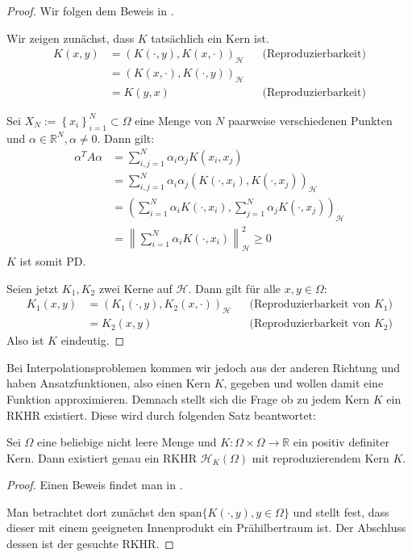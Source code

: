 \begin{proof}
Wir folgen dem Beweis in \textcite[Theorem 3.6]{Santin.2017}.

Wir zeigen zunächst, dass $K$ tatsächlich ein Kern ist.
\begin{align*}
K(x,y) &= \left( K(\cdot,y), K(x, \cdot)\right)_\mathcal{H} &&\text{(Reproduzierbarkeit)}\\
&= \left(K(x,\cdot), K(\cdot,y)\right)_\mathcal{H}\\
&= K(y,x) &&\text{(Reproduzierbarkeit)}
\end{align*}

Sei $X_N := \left\{ x_i \right\}_{i=1}^N \subset \Omega$ eine Menge von $N$ paarweise verschiedenen Punkten und $\alpha \in \mathbb{R}^N, \alpha \neq 0$. Dann gilt:
\begin{align*}
\alpha^T A \alpha &= \sum_{i,j=1}^N \alpha_i \alpha_j K(x_i, x_j)\\
&= \sum_{i,j=1}^N \alpha_i \alpha_j \left(K(\cdot, x_i), K(\cdot,x_j)\right)_\mathcal{H}\\
&= \left(\sum_{i=1}^N \alpha_i K(\cdot,x_i), \sum_{j=1}^N \alpha_j K(\cdot, x_j)\right)_\mathcal{H}\\
&= \left\| \sum_{i=1}^N \alpha_i K(\cdot,x_i)\right\|_\mathcal{H}^2 \geq 0
\end{align*}
$K$ ist somit \ac{PD}.

Seien jetzt $K_1, K_2$ zwei Kerne auf $\mathcal{H}$. Dann gilt für alle $x,y \in \Omega$:
\begin{align*}
K_1(x,y) &= (K_1(\cdot,y), K_2(x, \cdot))_\mathcal{H} &&\text{(Reproduzierbarkeit von }K_1\text{)}\\
&= K_2(x,y) &&\text{(Reproduzierbarkeit von }K_2\text{)}
\end{align*}
Also ist $K$ eindeutig.
\end{proof}

Bei Interpolationsproblemen kommen wir jedoch aus der anderen Richtung und haben Ansatzfunktionen, also einen Kern $K$, gegeben und wollen damit eine Funktion approximieren. Demnach stellt sich die Frage ob zu jedem Kern $K$ ein \ac{RKHR} existiert. Diese wird durch folgenden Satz beantwortet:

\begin{theorem}
Sei $\Omega$ eine beliebige nicht leere Menge und $K:\Omega \times \Omega \rightarrow \mathbb{R}$ ein positiv definiter Kern. Dann existiert genau ein \ac{RKHR} $\mathcal{H}_K (\Omega)$ mit reproduzierendem Kern $K$.
\end{theorem}
\begin{proof}
Einen Beweis findet man in \textcite[Kap. 10.2]{Wendland.2005}. 

Man betrachtet dort zunächst den $\text{span} \{K(\cdot,y), y \in \Omega \}$ und stellt fest, dass dieser mit einem geeigneten Innenprodukt ein Prähilbertraum ist. Der Abschluss dessen ist der gesuchte \ac{RKHR}.
\end{proof}

